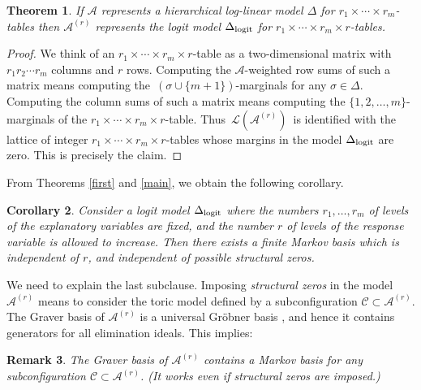 \documentclass[11pt]{amsart}
\newtheorem{theorem}{Theorem}
\newtheorem{remark}[theorem]{Remark}
\newtheorem{corollary}[theorem]{Corollary}
\theoremstyle{definition}
\newcommand{\C}{{\mathcal C}}
\renewcommand{\L}{{\mathcal L}}
\newcommand{\A}{{\mathcal A}}
\begin{document}
\begin{theorem}
If $\A$ represents a hierarchical log-linear model $\Delta$
for $r_1 \times \cdots \times r_m$-tables then $\A^{(r)}$
represents the logit model $\Delta_{\rm logit}$ for
$r_1 \times \cdots \times r_m \times r$-tables.
\end{theorem}

\begin{proof}
We think of an $r_1 \times \cdots \times r_m \times r$-table
as a two-dimensional matrix with
$r_1 r_2 \cdots r_m$ columns and $r$ rows.
Computing the $\A$-weighted row sums of such a matrix
means computing the   $\,(\sigma \cup \{m+1\})$-marginals
for any $\sigma \in \Delta$. Computing the column sums
of such a matrix means computing the $\{1,2,\ldots,m\}$-marginals
of the $r_1 \times \cdots \times r_m \times r$-table. Thus
$\, \L (\A^{(r)}) \,$ is identified with the lattice of integer
$r_1 \times \cdots \times r_m \times r$-tables whose margins
in the model $\Delta_{\rm logit}$ are zero. This is precisely the claim.
\end{proof}

   From Theorems \ref{first} and \ref{main},
we obtain the following corollary.

\smallskip

\begin{corollary}
\label{struc}
Consider a logit model $\Delta_{\rm logit}$ where the
numbers $r_1,\ldots,r_m$ of levels of the explanatory
variables are fixed, and the number $r$
of levels of the response variable is allowed to increase.
Then there exists a finite Markov basis which is
independent of $r$, and independent of possible  structural zeros.
\end{corollary}

We need to explain the last subclause.
Imposing {\em structural zeros} in
the model $\A^{(r)}$ means to consider
the toric model defined by a subconfiguration
$\C \subset \A^{(r)}$. The Graver basis
of $\A^{(r)}$ is a universal Gr\"obner basis
\cite[\S 7]{Sturmfels-book}, and hence it
contains generators for all  elimination ideals.
This implies:

\begin{remark}
The Graver basis of $\A^{(r)}$ contains
a Markov basis for any  subconfiguration $\C
\subset \A^{(r)}$. (It works
even if structural zeros are imposed.)
\end{remark}
\end{document}
